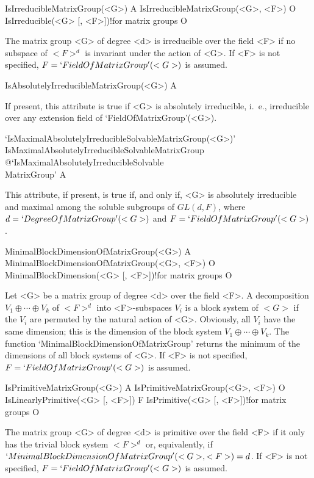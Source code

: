 \>IsIrreducibleMatrixGroup(<G>) A
\>IsIrreducibleMatrixGroup(<G>, <F>) O
\>IsIrreducible(<G> [, <F>])!{for matrix groups} O

The matrix group <G> of degree <d> is irreducible over the field <F> if no subspace of $<F>^d$ is
invariant under the action of <G>. If <F> is not
specified, $F = `FieldOfMatrixGroup'(<G>)$ is assumed.

\>IsAbsolutelyIrreducibleMatrixGroup(<G>) A

If present, this attribute is true if <G> is absolutely irreducible, i.~e., irreducible over any
extension field of `FieldOfMatrixGroup'(<G>).

\>`IsMaximalAbsolutelyIrreducibleSolvableMatrixGroup(<G>)'%
{IsMaximalAbsolutelyIrreducibleSolvableMatrixGroup}%
@{`IsMaximalAbsolutelyIrreducibleSolvable\\MatrixGroup'} A

This attribute, if present, is true if, and only if, <G> is absolutely irreducible and maximal among 
the soluble subgroups of $GL(d, F)$, where
$d = `DegreeOfMatrixGroup'(<G>)$ and
$F = `FieldOfMatrixGroup'(<G>)$. 


\>MinimalBlockDimensionOfMatrixGroup(<G>) A
\>MinimalBlockDimensionOfMatrixGroup(<G>, <F>) O
\>MinimalBlockDimension(<G> [, <F>])!{for matrix groups} O

Let <G> be a matrix group of degree <d> over the field <F>.  A 
decomposition $V_1 \oplus \cdots \oplus V_k$ of $<F>^d$ into <F>-subspaces
$V_i$ is a block system of $<G>$ if the $V_i$ are permuted by the natural
action of <G>. Obviously, all $V_i$ have the same dimension; this is the
dimension of the block system
$V_1 \oplus \cdots \oplus V_k$. The function
`MinimalBlockDimensionOfMatrixGroup' returns the minimum of the dimensions
of all block systems of <G>. If <F> is not specified, $F =
`FieldOfMatrixGroup'(<G>)$ is assumed.

\>IsPrimitiveMatrixGroup(<G>) A
\>IsPrimitiveMatrixGroup(<G>, <F>) O
\>IsLinearlyPrimitive(<G> [, <F>]) F
\>IsPrimitive(<G> [, <F>])!{for matrix groups} O

The matrix group <G> of degree <d> is primitive over the field <F> if it
only has the trivial block system $<F>^d$ or, equivalently, if
$`MinimalBlockDimensionOfMatrixGroup'(<G>, <F>) = d$. If <F> is not
specified, $F = `FieldOfMatrixGroup'(<G>)$ is assumed.


